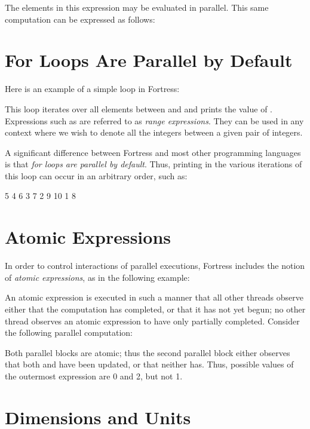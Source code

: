 The elements in this expression may be evaluated in parallel.
This same computation can be expressed as follows:



\section{For Loops Are Parallel by Default}
Here is an example of a simple  loop in Fortress:

This  loop iterates
over all elements  between  and 
and prints the value of .
Expressions such as 
are referred to as \emph{range expressions}.
They can be used in any context where
we wish to denote all the integers between a given pair of integers.

A significant difference between Fortress
and most other programming languages
is that \emph{for loops are parallel by default}.
Thus, printing in the various iterations
of this loop can occur in an arbitrary order, such as:

5 4 6 3 7 2 9 10 1 8

\section{Atomic Expressions}

In order to control interactions of parallel executions, Fortress
includes the notion of \emph{atomic expressions}, as in the following
example:



An atomic expression
is executed in such a manner that all other threads observe either that
the computation has completed, or that it has not yet begun; no other
thread observes an atomic expression to have only partially completed.
Consider the following parallel computation:


Both parallel blocks are atomic; thus the second parallel block either
observes that both  and  have been updated, or that
neither has. Thus, possible values of the outermost 
expression are 0 and 2, but not 1.

\section{Dimensions and Units}

